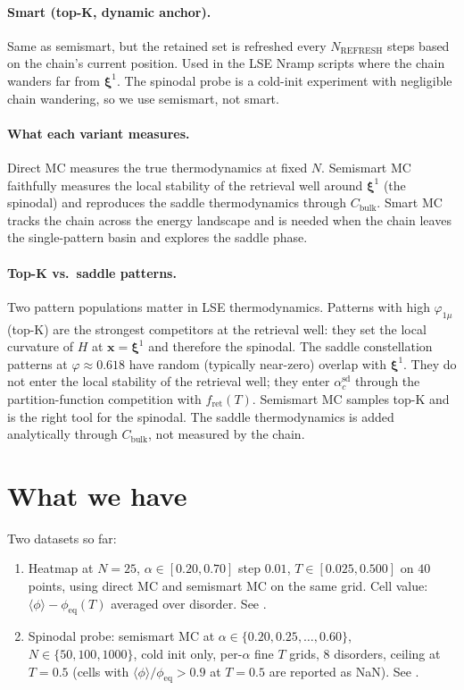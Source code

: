 \documentclass[11pt]{article}
\newcommand{\bxi}{\boldsymbol{\xi}}
\newcommand{\bx}{\bm{x}}
\newcommand{\avg}[1]{\langle #1 \rangle}
\newcommand{\phieq}{\phi_{\mathrm{eq}}}
\newcommand{\fret}{f_{\mathrm{ret}}}
\newcommand{\acSd}{\alpha_c^{\mathrm{sd}}}
\begin{document}
\paragraph{Smart (top-K, dynamic anchor).}
Same as semismart, but the retained set is refreshed every
$N_{\mathrm{REFRESH}}$ steps based on the chain's current position.
Used in the LSE Nramp scripts where the chain wanders far from
$\bxi^1$.  The spinodal probe is a cold-init experiment with negligible
chain wandering, so we use semismart, not smart.

\paragraph{What each variant measures.}
Direct MC measures the true thermodynamics at fixed $N$.  Semismart MC
faithfully measures the local stability of the retrieval well around
$\bxi^1$ (the spinodal) and reproduces the saddle thermodynamics through
$C_{\mathrm{bulk}}$.  Smart MC tracks the chain across the energy
landscape and is needed when the chain leaves the single-pattern basin
and explores the saddle phase.

\paragraph{Top-K vs.\ saddle patterns.}
Two pattern populations matter in LSE thermodynamics.  Patterns with
high $\varphi_{1\mu}$ (top-K) are the strongest competitors at the
retrieval well: they set the local curvature of $H$ at $\bx = \bxi^1$
and therefore the spinodal.  The saddle constellation patterns at
$\varphi \approx 0.618$ have random (typically near-zero) overlap with
$\bxi^1$.  They do not enter the local stability of the retrieval well;
they enter $\acSd$ through the partition-function competition with
$\fret(T)$.  Semismart MC samples top-K and is the right tool for the
spinodal.  The saddle thermodynamics is added analytically through
$C_{\mathrm{bulk}}$, not measured by the chain.

\section{What we have}
\label{sec:result}

Two datasets so far:
\begin{enumerate}
\item Heatmap at $N = 25$, $\alpha \in [0.20, 0.70]$ step $0.01$,
$T \in [0.025, 0.500]$ on $40$ points, using direct MC and semismart MC
on the same grid.  Cell value: $\avg{\phi} - \phieq(T)$ averaged over
disorder.  See .
\item Spinodal probe: semismart MC at
$\alpha \in \{0.20, 0.25, \ldots, 0.60\}$, $N \in \{50, 100, 1000\}$,
cold init only, per-$\alpha$ fine $T$ grids, $8$ disorders, ceiling at
$T = 0.5$ (cells with $\avg{\phi}/\phieq > 0.9$ at $T = 0.5$ are
reported as NaN).  See .
\end{enumerate}
\end{document}
